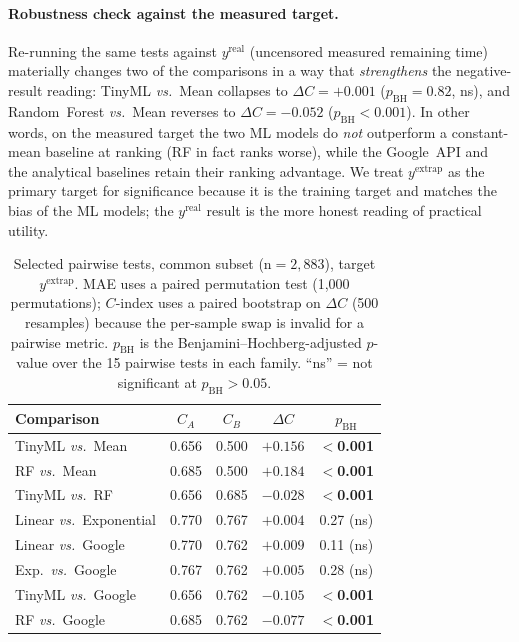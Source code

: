 \documentclass[conference]{IEEEtran}
\begin{document}
\paragraph{Robustness check against the measured target.} Re-running
the same tests against $y^{\text{real}}$ (uncensored measured
remaining time) materially changes two of the comparisons in a way
that \emph{strengthens} the negative-result reading: TinyML
\emph{vs.}\ Mean collapses to $\Delta C{=}{+}0.001$
($p_{\text{BH}}{=}0.82$, ns), and Random~Forest \emph{vs.}\ Mean
reverses to $\Delta C{=}{-}0.052$ ($p_{\text{BH}}<0.001$). In other
words, on the measured target the two ML models do \emph{not}
outperform a constant-mean baseline at ranking (RF in fact ranks
worse), while the Google~API and the analytical baselines retain
their ranking advantage. We treat $y^{\text{extrap}}$ as the
primary target for significance because it is the training target
and matches the bias of the ML models; the $y^{\text{real}}$ result
is the more honest reading of practical utility.

\begin{table}[t]
\caption{Selected pairwise tests, common subset (n${=}2{,}883$),
target $y^{\text{extrap}}$. MAE uses a paired permutation test
(1{,}000 permutations); $C$-index uses a paired bootstrap on
$\Delta C$ (500 resamples) because the per-sample swap is invalid
for a pairwise metric. $p_{\text{BH}}$ is the
Benjamini--Hochberg-adjusted $p$-value over the 15 pairwise tests in
each family. ``ns'' = not significant at $p_{\text{BH}}{>}0.05$.}
\label{tab:significance}
\centering
\small
\begin{tabular}{lcccc}
\toprule
Comparison & $C_A$ & $C_B$ & $\Delta C$ & $p_{\text{BH}}$ \\
\midrule
TinyML \emph{vs.}\ Mean        & 0.656 & 0.500 & $+0.156$ & \textbf{$<$0.001} \\
RF \emph{vs.}\ Mean            & 0.685 & 0.500 & $+0.184$ & \textbf{$<$0.001} \\
TinyML \emph{vs.}\ RF          & 0.656 & 0.685 & $-0.028$ & \textbf{$<$0.001} \\
Linear \emph{vs.}\ Exponential & 0.770 & 0.767 & $+0.004$ & 0.27 (ns) \\
Linear \emph{vs.}\ Google      & 0.770 & 0.762 & $+0.009$ & 0.11 (ns) \\
Exp.\ \emph{vs.}\ Google       & 0.767 & 0.762 & $+0.005$ & 0.28 (ns) \\
TinyML \emph{vs.}\ Google      & 0.656 & 0.762 & $-0.105$ & \textbf{$<$0.001} \\
RF \emph{vs.}\ Google          & 0.685 & 0.762 & $-0.077$ & \textbf{$<$0.001} \\
\bottomrule
\end{tabular}
\end{table}
\end{document}

